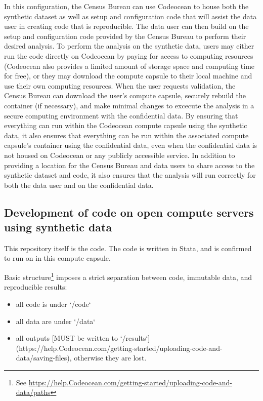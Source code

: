 \documentclass{article}
\begin{document}
In this configuration, the Census Bureau can use Codeocean to house both the synthetic dataset as well as
setup and configuration code that will assist the data user in creating code that is reproducible. The data
user can then build on the setup and configuration code provided by the Census Bureau to perform their
desired analysis. To perform the analysis on the synthetic data, users may either run the code directly on
Codeocean by paying for access to computing resources (Codeocean also provides a limited amount of
storage space and computing time for free), or they may download the compute capsule to their local
machine and use their own computing resources. When the user requests validation, the Census
Bureau can download the user’s compute capsule, securely rebuild the container (if necessary), and make minimal changes to excecute the analysis in a
secure computing environment with the confidential data. By ensuring that everything can
run within the Codeocean compute capsule using the synthetic data, it also ensures that everything can
be run within the associated compute capsule's container using the confidential data, even when the confidential data is not housed on Codeocean or any publicly accessible service.
In addition to providing a location for the Census Bureau and data users to share access to the synthetic
dataset and code, it also ensures that the analysis will run correctly for both the data user and on the
confidential data. 



\subsection{Development of code on open compute servers using synthetic data}

This repository itself is the code. The code is written in Stata, and is confirmed to run on in this compute capsule.

Basic structure\footnote{See \url{https://help.Codeocean.com/getting-started/uploading-code-and-data/paths}} imposes a strict separation between code, immutable data, and reproducible results:

\begin{itemize}
    \item all code is under `/code`
    \item all data are under `/data`
    \item all outputs [MUST be written to `/results`](https://help.Codeocean.com/getting-started/uploading-code-and-data/saving-files), otherwise they are lost.

\end{itemize}
\end{document}
